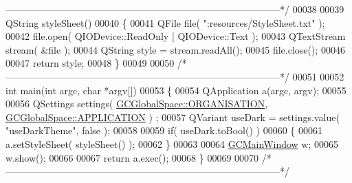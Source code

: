 \begin{DoxyCode}
{      --------------------------------------------------------------------------------------*/}
00038 
00039 QString styleSheet()
00040 \{
00041   QFile file( \textcolor{stringliteral}{":resources/StyleSheet.txt"} );
00042   file.open( QIODevice::ReadOnly | QIODevice::Text );
00043   QTextStream stream( &file );
00044   QString style = stream.readAll();
00045   file.close();
00046 
00047   \textcolor{keywordflow}{return} style;
00048 \}
00049 
00050 \textcolor{comment}{/*
      --------------------------------------------------------------------------------------*/}
00051 
00052 \textcolor{keywordtype}{int} main(\textcolor{keywordtype}{int} argc, \textcolor{keywordtype}{char} *argv[])
00053 \{
00054   QApplication a(argc, argv);
00055 
00056   QSettings settings( \hyperlink{namespace_g_c_global_space_a97583835f9987b1c94ff05802ccfe42f}{GCGlobalSpace::ORGANISATION}, \hyperlink{namespace_g_c_global_space_ab53b9c3447f00f1cc45a1d3fdfbba564}{GCGlobalSpace::APPLICATION} )
      ;
00057   QVariant useDark = settings.value( \textcolor{stringliteral}{"useDarkTheme"}, \textcolor{keyword}{false} );
00058 
00059   \textcolor{keywordflow}{if}( useDark.toBool() )
00060   \{
00061     a.setStyleSheet( styleSheet() );
00062   \}
00063 
00064   \hyperlink{class_g_c_main_window}{GCMainWindow} w;
00065   w.show();
00066   
00067   \textcolor{keywordflow}{return} a.exec();
00068 \}
00069 
00070 \textcolor{comment}{/*
      --------------------------------------------------------------------------------------*/}
\end{DoxyCode}
